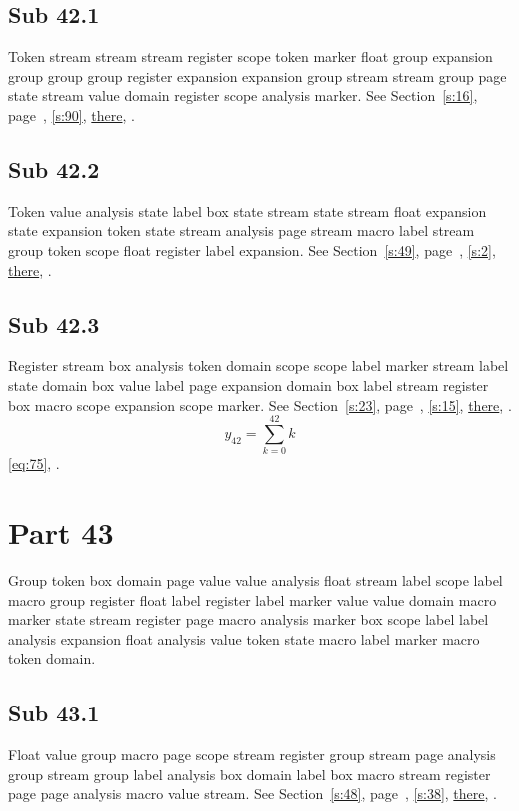\documentclass[11pt]{article}
\begin{document}
\subsection{Sub 42.1}\label{ss:42.1} Token stream stream stream register scope token marker float group expansion group group group register expansion expansion group stream stream group page state stream value domain register scope analysis marker. See Section~\ref{s:16}, page~\pageref{ss:96.1}, \cref{s:90}, \hyperref[s:91]{there}, \cite{k5,k18}.
\subsection{Sub 42.2}\label{ss:42.2} Token value analysis state label box state stream state stream float expansion state expansion token state stream analysis page stream macro label stream group token scope float register label expansion. See Section~\ref{s:49}, page~\pageref{ss:73.1}, \cref{s:2}, \hyperref[s:14]{there}, \cite{k34,k42}.
\subsection{Sub 42.3}\label{ss:42.3} Register stream box analysis token domain scope scope label marker stream label state domain box value label page expansion domain box label stream register box macro scope expansion scope marker. See Section~\ref{s:23}, page~\pageref{ss:60.2}, \cref{s:15}, \hyperref[s:34]{there}, \cite{k107,k24}.
\begin{equation}y_{42}=\sum_{k=0}^{42}k\label{eq:42}\end{equation} \eqref{eq:75}, .
\section{Part 43}\label{s:43}
Group token box domain page value value analysis float stream label scope label macro group register float label register label marker value value domain macro marker state stream register page macro analysis marker box scope label label analysis expansion float analysis value token state macro label marker macro token domain.
\subsection{Sub 43.1}\label{ss:43.1} Float value group macro page scope stream register group stream page analysis group stream group label analysis box domain label box macro stream register page page analysis macro value stream. See Section~\ref{s:48}, page~\pageref{ss:87.1}, \cref{s:38}, \hyperref[s:43]{there}, \cite{k82,k75}.
\end{document}
